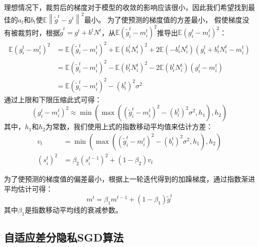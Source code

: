 理想情况下，裁剪后的梯度对于模型的收敛的影响应该很小，因此我们希望找到最佳的$a_{t}$和$b_{t}$使$\mathbb{E}\left\|\tilde{g}^{t}-g^{t}\right\|^{2}$最小。 
为了使预测的梯度值的方差最小， 假使梯度没有被裁剪时，根据$\tilde{g}^{t}=g^{t}+b^{t} N^{t}$，从$\mathbb{E}\left(\tilde{g}_{i}^{t}-m_{i}^{t}\right)^{2}$推导出$\mathbb{E}\left(g_{i}^{t}-m_{i}^{t}\right)^{2}$：
$$
\begin{aligned}
\mathbb{E}\left(g_{i}^{t}-m_{i}^{t}\right)^{2} &=\mathbb{E}\left(\tilde{g}_{i}^{t}-m_{i}^{t}\right)^{2}+\mathbb{E}\left(b_{i}^{t} N_{i}^{t}\right)^{2}+2 \mathbb{E}\left(-b_{i}^{t} N_{i}^{t}\right)\left(g_{i}^{t}+b_{i}^{t} N_{i}^{t}-m_{i}^{t}\right) \\
&=\mathbb{E}\left(\tilde{g}_{i}^{t}-m_{i}^{t}\right)^{2}-\mathbb{E}\left(b_{i}^{t} N_{i}^{t}\right)^{2}-2 \mathbb{E}\left(b_{i}^{t} N_{i}^{t}\right)\left(g_{i}^{t}-m_{i}^{t}\right) \\
&=\mathbb{E}\left(\tilde{g}_{i}^{t}-m_{i}^{t}\right)^{2}-\left(b_{i}^{t}\right)^{2} \sigma^{2}
\end{aligned}
$$
通过上限和下限压缩此式可得：
$$
\left(g_{i}^{t}-m_{i}^{t}\right)^{2} \approx \min \left(\max \left(\left(\tilde{g}_{i}^{t}-m_{i}^{t}\right)^{2}-\left(b_{i}^{t}\right)^{2} \sigma^{2}, h_{1}\right), h_{2}\right)
$$
其中，$h_{1}$和$h_{2}$为常数，我们使用上式的指数移动平均值来估计方差：
\begin{equation}\label{eq:梯度方差估计}
\begin{aligned}
v_{t} &=\min \left(\max \left(\left(\tilde{g}_{i}^{t}-m_{i}^{t}\right)^{2}-\left(b_{i}^{t}\right)^{2} \sigma^{2}, h_{1}\right), h_{2}\right) \\
\left(s_{i}^{t}\right)^{2} &=\beta_{2}\left(s_{i}^{t-1}\right)^{2}+\left(1-\beta_{2}\right) v_{t}
\end{aligned}
\end{equation}

为了使预测的梯度值的偏差最小，根据上一轮迭代得到的加躁梯度，通过指数渐进平均估计可得：
\begin{equation}\label{eq:梯度偏差估计}
m^{t}=\beta_{1} m^{t-1}+\left(1-\beta_{1}\right) \tilde{g}^{t}
\end{equation}
其中$\beta_{1}$是指数移动平均线的衰减参数。

\subsection{自适应差分隐私SGD算法}

